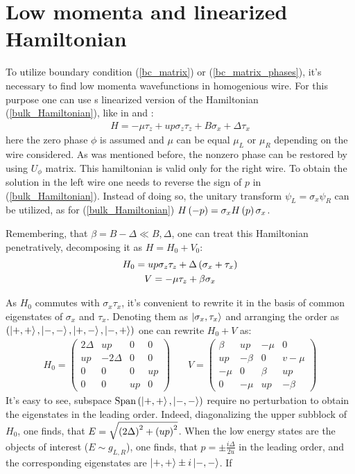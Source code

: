 \section{Low momenta and linearized Hamiltonian}
\label{sec:linearized_hamiltonian}

To utilize boundary condition (\ref{bc_matrix}) or (\ref{bc_matrix_phases}), it's necessary to find low momenta wavefunctions in homogenious wire. For this purpose one can use s linearized version of the Hamiltonian (\ref{bulk_Hamiltonian}), like in \cite{Oreg_2010} and \cite{Lutchyn_2010}:
\begin{gather}
\label{linearized_hamiltonian}
		H
	=
	-\mu \tau_z
	+
	u p \sigma_z \tau_z
	+
	B\sigma_x	
	+
	\Delta\tau_x
\end{gather}
here the zero phase $ \phi $ is assumed and $ \mu $ can be equal $ \mu_L $ or $ \mu_R $ depending on the wire considered. As was mentioned before, the nonzero phase can be restored by using $ U_\phi $ matrix. This hamiltonian is valid only for the right wire. To obtain the solution in the left wire one needs to reverse the sign of $ p $ in (\ref{bulk_Hamiltonian}). Instead of doing so, the unitary transform $ \psi_L=\sigma_x\psi_R $ can be utilized, as for (\ref{bulk_Hamiltonian}) $ H\left(-p\right)=\sigma_x H\left(p\right)\sigma_x $.

Remembering, that $ \beta=B-\Delta\ll B, \Delta $, one can	treat this Hamiltonian penetratively, decomposing it as $ H=H_0+V_0$:
\begin{gather}
	H_0=
	u p \sigma_z \tau_z
	+
	\Delta
	\left(\sigma_x	
	+
	\tau_x\right)
\\
V=-\mu \tau_z+\beta\sigma_x
\end{gather}

As $ H_0 $ commutes with $ \sigma_x\tau_x $, it's convenient to rewrite it in the basis of common eigenstates of $ \sigma_x $ and $ \tau_x $. Denoting them as $ \ket{\sigma_x, \tau_x }$ and arranging the order as $  \left(\ket{+, + },\ket{-, - },\ket{+, - },\ket{-, + }\right) $ one can rewrite $ H_0+V $ as:
\begin{gather}
	H_0
	=
	\begin{pmatrix}
	2\Delta & up & 0 & 0 \\
	up & -2\Delta & 0 & 0\\
	0 & 0 & 0 & up \\
	0 & 0 & up & 0 
	\end{pmatrix}
	~~~~~~~~
	V
	=
		\begin{pmatrix}
	\beta & up & -\mu & 0 \\
	up & -\beta & 0 & v-\mu\\
	-\mu & 0 & \beta & up \\
	0 & -\mu & up & -\beta 
	\end{pmatrix}
\end{gather}
It's easy to see, subspace $ \mathrm{Span}\left(\ket{+, + },\ket{-, - }\right) $ require no perturbation to obtain the eigenstates in the leading order. Indeed, diagonalizing the upper subblock of $ H_0 $, one finds, that $ E=\sqrt{\left(2\Delta\right)^2+\left(up\right)^2} $. When the low energy states are the objects of interest ($ E\sim g_{L,R} $), one finds, that $ p =\pm\frac{i\Delta}{2u} $ in the leading order, and the corresponding eigenstates are $\ket{+, + }\pm i\ket{-, - } $. If

